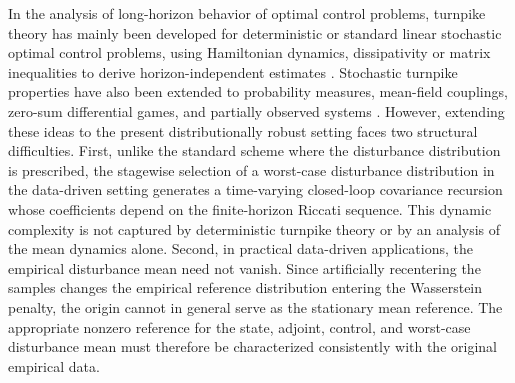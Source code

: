 \documentclass[10pt,journal,twoside]{IEEEtran}
\theoremstyle{definition}
\theoremstyle{remark}
\begin{document}
In the analysis of long-horizon behavior of optimal control problems, turnpike theory has mainly been developed for deterministic or standard linear
stochastic optimal control problems, using Hamiltonian dynamics, dissipativity or matrix inequalities to derive horizon-independent estimates
\cite{DammGruneStielerWorthmann2014,
GruneGuglielmi2018,BerberichEtAl2018,SchiesslBaumannFaulwasserGrune2025}.
Stochastic turnpike properties have also been extended to probability measures, mean-field couplings, zero-sum differential games, and partially observed systems \cite{SunWangYong2022,SunYong2024,SunYong2025Game,HuWu2026,Schie2025}. 
However, extending these ideas to the present distributionally robust setting faces two structural difficulties. First, unlike the standard scheme where the disturbance distribution is prescribed, the stagewise selection of a worst-case disturbance distribution in the data-driven setting generates a time-varying closed-loop covariance recursion whose coefficients depend on the finite-horizon Riccati sequence. This dynamic complexity is not captured by deterministic turnpike theory or by an analysis of the mean dynamics alone. Second, in practical data-driven applications, the empirical disturbance mean need not vanish. Since artificially recentering the samples changes the empirical reference distribution entering the Wasserstein penalty, the origin cannot in general serve as the stationary mean reference. The appropriate nonzero reference for the state, adjoint, control, and worst-case disturbance mean must therefore be characterized consistently with the original empirical data.








\end{document}
